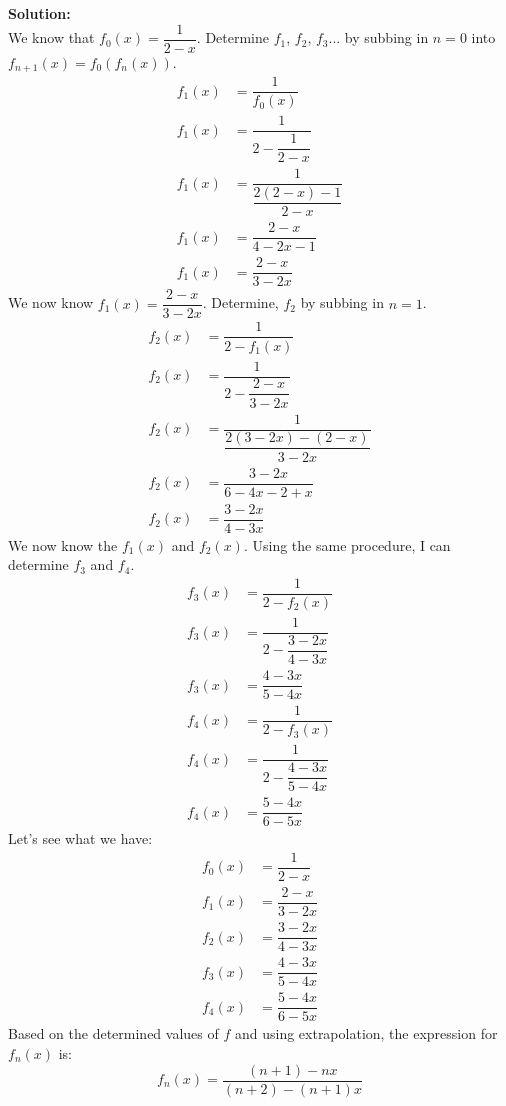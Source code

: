 \documentclass[12pt]{book}
\begin{document}
\begin{enumerate}
\begin{enumerate}
\textbf{Solution:}\\
We know that $f_0(x) = \dfrac{1}{2-x}$. Determine $f_1$, $f_2$, $f_3$... by subbing in $n = 0$ into $f_{n+1}(x) = f_0(f_n(x))$.
\setcounter{equation}{0}
\begingroup
\addtolength{\jot}{0.5em}
\begin{align*}
    f_1(x) &= \dfrac{1}{f_0(x)} \\
    f_1(x) &= \dfrac{1}{2-\dfrac{1}{2-x}} \\
    f_1(x) &= \dfrac{1}{\dfrac{2(2-x) - 1}{2-x}} \\
    f_1(x) &= \dfrac{2-x}{4-2x - 1} \\
    f_1(x) &= \dfrac{2-x}{3-2x}
\end{align*}
We now know $f_1(x) = \dfrac{2-x}{3-2x}$. Determine, $f_2$ by subbing in $n=1$.
\setcounter{equation}{0}
\begingroup
\addtolength{\jot}{0.5em}
\begin{align*}
    f_2(x) &= \dfrac{1}{2-f_1(x)} \\
    f_2(x) &= \dfrac{1}{2-\dfrac{2-x}{3-2x}} \\
    f_2(x) &= \dfrac{1}{\dfrac{2(3-2x) - (2-x)}{3-2x}} \\
    f_2(x) &= \dfrac{3-2x}{6-4x-2+x} \\
    f_2(x) &= \dfrac{3-2x}{4-3x}
\end{align*}
\endgroup
We now know the $f_1(x)$ and $f_2(x)$. Using the same procedure, I can determine $f_3$ and $f_4$.
\setcounter{equation}{0}
\begingroup
\addtolength{\jot}{0.5em}
\begin{align*}
    f_3(x) &= \dfrac{1}{2-f_2(x)} \\
    f_3(x) &= \dfrac{1}{2-\dfrac{3-2x}{4-3x}} \\
    f_3(x) &= \dfrac{4-3x}{5-4x}\\
    f_4(x) &= \dfrac{1}{2-f_3(x)} \\
    f_4(x) &= \dfrac{1}{2-\dfrac{4-3x}{5-4x}} \\
    f_4(x) &= \dfrac{5-4x}{6-5x}
\end{align*}
\endgroup
    Let's see what we have:
\begin{align*}
    f_0(x) &=\dfrac{1}{2-x} \\
    f_1(x) &= \dfrac{2-x}{3-2x} \\
    f_2(x) &= \dfrac{3-2x}{4-3x} \\
    f_3(x) &= \dfrac{4-3x}{5-4x} \\
    f_4(x) &= \dfrac{5-4x}{6-5x}
\end{align*}
Based on the determined values of $f$ and using extrapolation, the expression for $f_n(x)$ is:
$$f_n(x) = \dfrac{(n+1) - nx}{(n+2) - (n+1)x}$$


\end{enumerate}
\end{enumerate}
\end{document}
